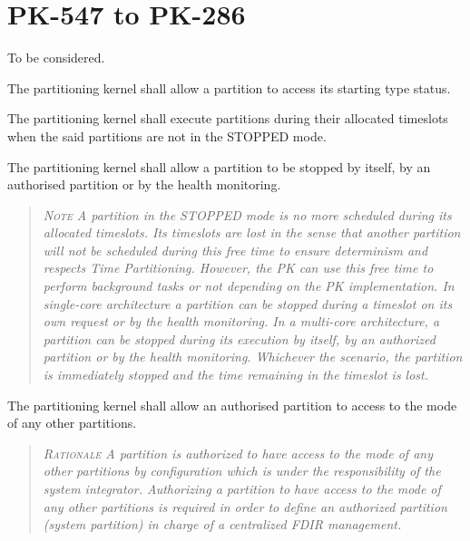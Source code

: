 \section{PK-547 to PK-286}

To be considered.

The partitioning kernel shall allow a partition to access its starting type status.

The partitioning kernel shall execute partitions during their allocated timeslots when the said partitions are not in the STOPPED mode.

The partitioning kernel shall allow a partition to be stopped by itself, by an authorised partition or by the health monitoring.
\begin{quote}\it
\textsc{Note}
A partition in the STOPPED mode is no more scheduled during its allocated timeslots. Its  timeslots are lost in the sense that another partition will not be scheduled during this free time to ensure determinism and respects Time Partitioning. However, the PK can use this free time to perform background tasks or not depending on the PK implementation.  In single-core architecture a partition can be stopped during a timeslot on its own request or by the health monitoring. In a multi-core architecture, a partition can be stopped during its execution by itself, by an authorized partition or by the health monitoring. Whichever the scenario, the partition is immediately stopped and the time remaining in the timeslot is lost.
\end{quote}

The partitioning kernel shall allow an authorised partition to access to the mode of any other partitions.
\begin{quote}\it
\textsc{Rationale}
A partition is authorized to have access to the mode of any other partitions by configuration which is under the responsibility of the system integrator. Authorizing a partition to have access to the mode of any other partitions is required in order to define an authorized partition (system partition) in charge of a centralized FDIR management.
\end{quote}
